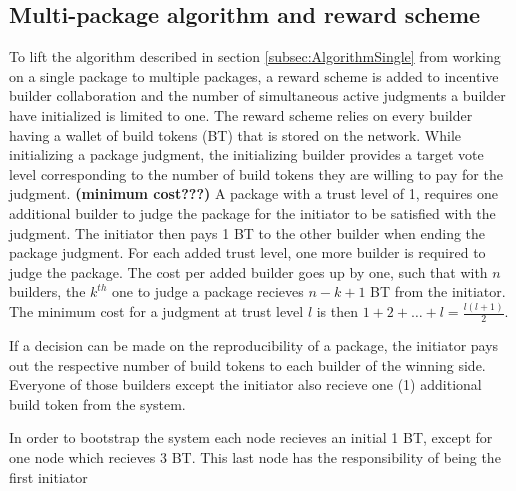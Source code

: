 \subsection{Multi-package algorithm and reward scheme}

To lift the algorithm described in section \ref{subsec:AlgorithmSingle} from working on a single package to multiple packages, a reward scheme is added to incentive builder collaboration and the number of simultaneous active judgments a builder have initialized is limited to one. The reward scheme relies on every builder having a wallet of build tokens (BT) that is stored on the network. While initializing a package judgment, the initializing builder provides a target vote level corresponding to the number of build tokens they are willing to pay for the judgment. \textbf{(minimum cost???)} A package with a trust level of 1, requires one additional builder to judge the package for the initiator to be satisfied with the judgment. The initiator then pays 1 BT to the other builder when ending the package judgment. For each added trust level, one more builder is required to judge the package. The cost per added builder goes up by one, such that with $n$ builders, the $k^{th}$ one to judge a package recieves $n - k + 1$ BT from the initiator. The minimum cost for a judgment at trust level $l$ is then $1 + 2 + \dotsc + l = \frac{l(l+1)}{2}$.

If a decision can be made on the reproducibility of a package, the initiator pays out the respective number of build tokens to each builder of the winning side. Everyone of those builders except the initiator also recieve one (1) additional build token from the system.

In order to bootstrap the system each node recieves an initial 1 BT, except for one node which recieves 3 BT. This last node has the responsibility of being the first initiator